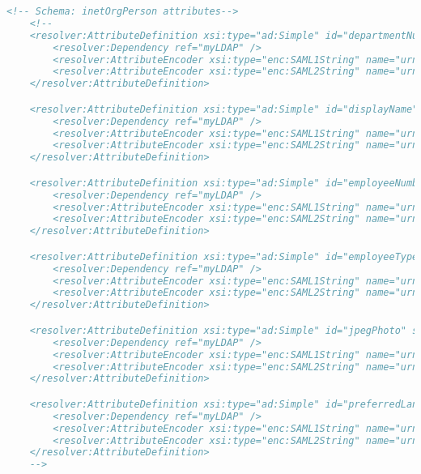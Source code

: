 \begin{lstlisting}[language=xml]
    <!-- Schema: inetOrgPerson attributes-->
    <!--
    <resolver:AttributeDefinition xsi:type="ad:Simple" id="departmentNumber" sourceAttributeID="departmentNumber">
        <resolver:Dependency ref="myLDAP" />
        <resolver:AttributeEncoder xsi:type="enc:SAML1String" name="urn:mace:dir:attribute-def:departmentNumber" />
        <resolver:AttributeEncoder xsi:type="enc:SAML2String" name="urn:oid:2.16.840.1.113730.3.1.2" friendlyName="departmentNumber" />
    </resolver:AttributeDefinition>

    <resolver:AttributeDefinition xsi:type="ad:Simple" id="displayName" sourceAttributeID="displayName">
        <resolver:Dependency ref="myLDAP" />
        <resolver:AttributeEncoder xsi:type="enc:SAML1String" name="urn:mace:dir:attribute-def:displayName" />
        <resolver:AttributeEncoder xsi:type="enc:SAML2String" name="urn:oid:2.16.840.1.113730.3.1.241" friendlyName="displayName" />
    </resolver:AttributeDefinition>

    <resolver:AttributeDefinition xsi:type="ad:Simple" id="employeeNumber" sourceAttributeID="employeeNumber">
        <resolver:Dependency ref="myLDAP" />
        <resolver:AttributeEncoder xsi:type="enc:SAML1String" name="urn:mace:dir:attribute-def:employeeNumber" />
        <resolver:AttributeEncoder xsi:type="enc:SAML2String" name="urn:oid:2.16.840.1.113730.3.1.3" friendlyName="employeeNumber" />
    </resolver:AttributeDefinition>

    <resolver:AttributeDefinition xsi:type="ad:Simple" id="employeeType" sourceAttributeID="employeeType">
        <resolver:Dependency ref="myLDAP" />
        <resolver:AttributeEncoder xsi:type="enc:SAML1String" name="urn:mace:dir:attribute-def:employeeType" />
        <resolver:AttributeEncoder xsi:type="enc:SAML2String" name="urn:oid:2.16.840.1.113730.3.1.4" friendlyName="employeeType" />
    </resolver:AttributeDefinition>

    <resolver:AttributeDefinition xsi:type="ad:Simple" id="jpegPhoto" sourceAttributeID="jpegPhoto">
        <resolver:Dependency ref="myLDAP" />
        <resolver:AttributeEncoder xsi:type="enc:SAML1String" name="urn:mace:dir:attribute-def:jpegPhoto" />
        <resolver:AttributeEncoder xsi:type="enc:SAML2String" name="urn:oid:0.9.2342.19200300.100.1.60" friendlyName="jpegPhoto" />
    </resolver:AttributeDefinition>

    <resolver:AttributeDefinition xsi:type="ad:Simple" id="preferredLanguage" sourceAttributeID="preferredLanguage">
        <resolver:Dependency ref="myLDAP" />
        <resolver:AttributeEncoder xsi:type="enc:SAML1String" name="urn:mace:dir:attribute-def:preferredLanguage" />
        <resolver:AttributeEncoder xsi:type="enc:SAML2String" name="urn:oid:2.16.840.1.113730.3.1.39" friendlyName="preferredLanguage" />
    </resolver:AttributeDefinition>
    -->


\end{lstlisting}
